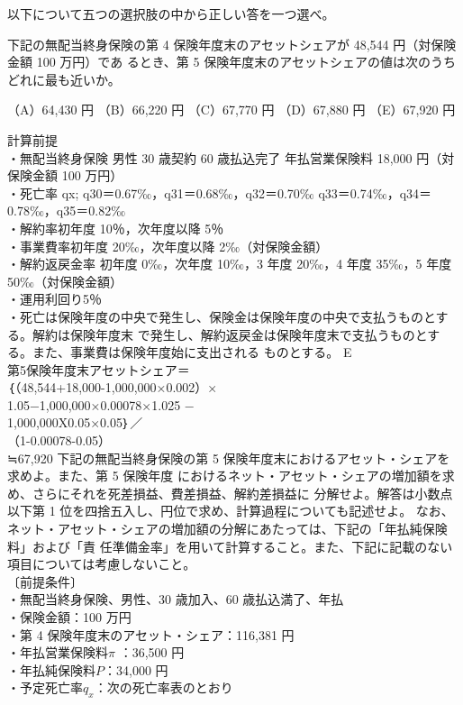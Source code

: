 \documentclass[report,gutter=10mm,fore-edge=10mm,uplatex,dvipdfmx]{jlreq}
\begin{document}
以下について五つの選択肢の中から正しい答を一つ選べ。

下記の無配当終身保険の第 4 保険年度末のアセットシェアが 48,544 円（対保険金額 100 万円）であ
るとき、第 5 保険年度末のアセットシェアの値は次のうちどれに最も近いか。

（A）64,430 円
（B）66,220 円
（C）67,770 円
（D）67,880 円
（E）67,920 円

\noindent
計算前提\\
・無配当終身保険 男性
30 歳契約 60 歳払込完了
年払営業保険料 18,000 円（対保険金額 100 万円）\\
・死亡率 qx; q30＝0.67‰，q31＝0.68‰，q32＝0.70‰ q33＝0.74‰，q34＝0.78‰，q35＝0.82‰\\
・解約率初年度 10％，次年度以降 5％\\
・事業費率初年度 20‰，次年度以降 2‰（対保険金額）\\
・解約返戻金率 初年度 0‰，次年度 10‰，3 年度 20‰，4 年度 35‰，5 年度 50‰（対保険金額）\\
・運用利回り5％\\
・死亡は保険年度の中央で発生し、保険金は保険年度の中央で支払うものとする。解約は保険年度末
で発生し、解約返戻金は保険年度末で支払うものとする。また、事業費は保険年度始に支出される
ものとする。
\answer{}
E\\
第5保険年度末アセットシェア＝\\
｛（48,544+18,000-1,000,000×0.002）×\\
1.05−1,000,000×0.00078×1.025 −\\
1,000,000X0.05×0.05｝／\\
（1-0.00078-0.05）\\
≒67,920
下記の無配当終身保険の第 5 保険年度末におけるアセット・シェアを求めよ。また、第 5 保険年度
におけるネット・アセット・シェアの増加額を求め、さらにそれを死差損益、費差損益、解約差損益に
分解せよ。解答は小数点以下第 1 位を四捨五入し、円位で求め、計算過程についても記述せよ。
なお、ネット・アセット・シェアの増加額の分解にあたっては、下記の「年払純保険料」および「責
任準備金率」を用いて計算すること。また、下記に記載のない項目については考慮しないこと。\\
〔前提条件〕\\
・無配当終身保険、男性、30 歳加入、60 歳払込満了、年払\\
・保険金額：100 万円\\
・第 4 保険年度末のアセット・シェア：116,381 円\\
・年払営業保険料$\pi$ ：36,500 円\\
・年払純保険料$P$：34,000 円\\
・予定死亡率$q_x$：次の死亡率表のとおり
\end{document}
